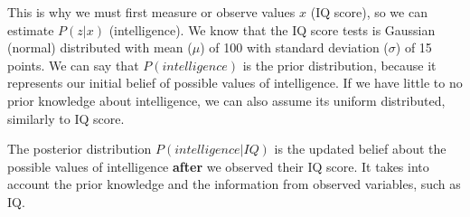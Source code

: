 \begin{center}
\end{center}

This is why we must first measure or observe values $x$ (IQ score), so we can estimate $P(z|x)$ (intelligence). We know that the IQ score tests is Gaussian (normal) distributed with mean ($\mu$) of 100 with standard deviation ($\sigma$) of 15 points. We can say that $P(intelligence)$ is the prior distribution, because it represents our initial belief of possible values of intelligence. If we have little to no prior knowledge about intelligence, we can also assume its uniform distributed, similarly to IQ score.

The posterior distribution $P(intelligence|IQ)$ is the updated belief about the possible values of intelligence \textbf{after} we observed their IQ score. It takes into account the prior knowledge and the information from observed variables, such as IQ.

